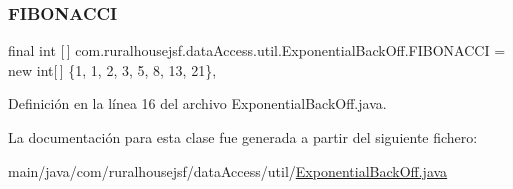 \subsubsection{\texorpdfstring{FIBONACCI}{FIBONACCI}}
{\footnotesize\ttfamily final int \mbox{[}$\,$\mbox{]} com.\+ruralhousejsf.\+data\+Access.\+util.\+Exponential\+Back\+Off.\+F\+I\+B\+O\+N\+A\+C\+CI = new int\mbox{[}$\,$\mbox{]} \{1, 1, 2, 3, 5, 8, 13, 21\}\hspace{0.3cm}{\ttfamily [static]}, {\ttfamily [private]}}



Definición en la línea 16 del archivo Exponential\+Back\+Off.\+java.



La documentación para esta clase fue generada a partir del siguiente fichero\+:\begin{DoxyCompactItemize}
\item 
main/java/com/ruralhousejsf/data\+Access/util/\mbox{\hyperlink{_exponential_back_off_8java}{Exponential\+Back\+Off.\+java}}\end{DoxyCompactItemize}
